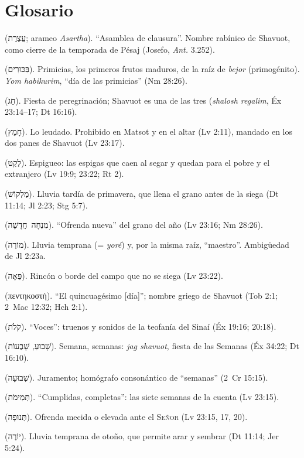 \documentclass[11pt,letterpaper]{article}
\newcommand{\heb}[1]{\mbox{\foreignlanguage{hebrew}{#1}}}
\newcommand{\grc}[1]{\foreignlanguage{ancientgreek}{#1}}
\newcommand{\SENOR}{\textsc{Señor}}
\begin{document}
\section*{Glosario}
\begin{description}\small\setlength{\itemsep}{1pt}
\item[\emph{Atséret}] (\heb{עֲצֶרֶת}; arameo \emph{Asartha}). ``Asamblea de clausura''. Nombre rabínico de Shavuot, como cierre de la temporada de Pésaj (Josefo, \emph{Ant.} 3.252).
\item[\emph{Bikurim}] (\heb{בִּכּוּרִים}). Primicias, los primeros frutos maduros, de la raíz de \emph{bejor} (primogénito). \emph{Yom habikurim}, ``día de las primicias'' (Nm 28:26).
\item[\emph{Jag}] (\heb{חַג}). Fiesta de peregrinación; Shavuot es una de las tres (\emph{shalosh regalim}, Éx 23:14--17; Dt 16:16).
\item[\emph{Jamets}] (\heb{חָמֵץ}). Lo leudado. Prohibido en Matsot y en el altar (Lv 2:11), mandado en los dos panes de Shavuot (Lv 23:17).
\item[\emph{Léqet}] (\heb{לֶקֶט}). Espigueo: las espigas que caen al segar y quedan para el pobre y el extranjero (Lv 19:9; 23:22; Rt 2).
\item[\emph{Malqosh}] (\heb{מַלְקוֹשׁ}). Lluvia tardía de primavera, que llena el grano antes de la siega (Dt 11:14; Jl 2:23; Stg 5:7).
\item[\emph{Minjá jadashá}] (\heb{מִנְחָה חֲדָשָׁה}). ``Ofrenda nueva'' del grano del año (Lv 23:16; Nm 28:26).
\item[\emph{Moré}] (\heb{מוֹרֶה}). Lluvia temprana (= \emph{yoré}) y, por la misma raíz, ``maestro''. Ambigüedad de Jl 2:23a.
\item[\emph{Peá}] (\heb{פֵּאָה}). Rincón o borde del campo que no se siega (Lv 23:22).
\item[Pentecostés] (\grc{πεντηκοστή}). ``El quincuagésimo [día]''; nombre griego de Shavuot (Tob 2:1; 2~Mac 12:32; Hch 2:1).
\item[\emph{Qolot}] (\heb{קֹלֹת}). ``Voces'': truenos y sonidos de la teofanía del Sinaí (Éx 19:16; 20:18).
\item[\emph{Shavúa}, \emph{shavuot}] (\heb{שָׁבוּעַ}, \heb{שָׁבֻעוֹת}). Semana, semanas: \emph{jag shavuot}, fiesta de las Semanas (Éx 34:22; Dt 16:10).
\item[\emph{Shevuá}] (\heb{שְׁבוּעָה}). Juramento; homógrafo consonántico de ``semanas'' (2~Cr 15:15).
\item[\emph{Temimot}] (\heb{תְּמִימֹת}). ``Cumplidas, completas'': las siete semanas de la cuenta (Lv 23:15).
\item[\emph{Tenufá}] (\heb{תְּנוּפָה}). Ofrenda mecida o elevada ante el \SENOR{} (Lv 23:15, 17, 20).
\item[\emph{Yoré}] (\heb{יוֹרֶה}). Lluvia temprana de otoño, que permite arar y sembrar (Dt 11:14; Jer 5:24).
\end{description}
\end{document}
